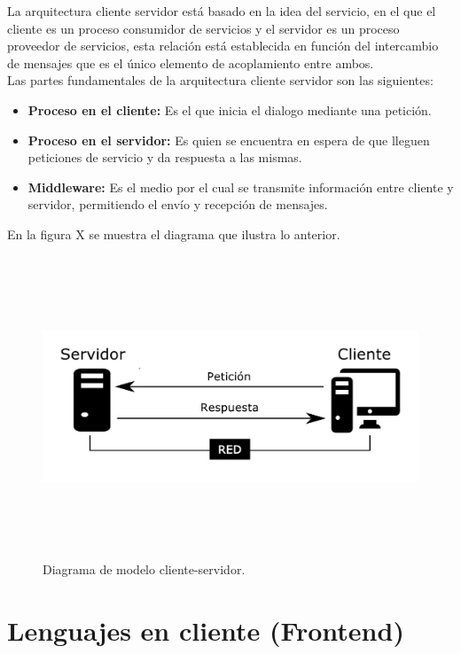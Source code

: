 La arquitectura cliente servidor est\'a basado en la idea del servicio, en el que el cliente es un proceso consumidor de servicios y el servidor es un proceso proveedor de servicios, esta relaci\'on est\'a establecida en funci\'on del intercambio de mensajes que es el \'unico elemento de acoplamiento entre ambos.\\

Las partes fundamentales de la arquitectura cliente servidor son las siguientes:

\begin{itemize}
	\item \textbf{Proceso en el cliente:} Es el que inicia el dialogo mediante una petici\'on.
	\item \textbf{Proceso en el servidor:} Es quien se encuentra en espera de que lleguen peticiones de servicio y da respuesta a las mismas.
	\item \textbf{Middleware:} Es el medio por el cual se transmite informaci\'on entre cliente y servidor, permitiendo el env\'io y recepci\'on de mensajes.
\end{itemize}

En la figura X se muestra el diagrama que ilustra lo anterior.


	\begin{figure}[htb]
        \centering
        \includegraphics[width=14cm, height=9cm]{figuras/clienteservidor}
        \caption{Diagrama de modelo cliente-servidor.}
        \label{fig_clienteservidor}
    \end{figure}



\section{Lenguajes en cliente (Frontend)}
